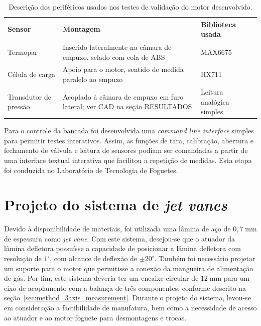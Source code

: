 
\begin{table}[htbp]
    \centering\begin{tabular}{p{}p{}p{}} \toprule
        Sensor & Montagem & Biblioteca usada \\ \midrule
        Termopar & Inserido lateralmente na câmara de empuxo, selado com cola de ABS & MAX6675 \\
        Célula de carga & Apoio para o motor, sentido de medida paralelo ao empuxo & HX711 \\
        Transdutor de pressão & Acoplado à câmara de empuxo em furo lateral; ver CAD na seção RESULTADOS & Leitura analógica simples \\ \bottomrule
    \end{tabular}
    \caption{Descrição dos periféricos usados nos testes de validação do motor desenvolvido.}\label{tab:validation_peripherals}
\end{table}

Para o controle da bancada foi desenvolvida uma \textit{command line interface} simples para permitir testes interativos. Assim, as funções de tara, calibração, abertura e fechamento de válvula e leitura de sensores podiam ser comandadas a partir de uma interface textual interativa que facilitou a repetição de medidas. Esta etapa foi conduzida no Laboratório de Tecnologia de Foguetes.

\section{Projeto do sistema de \textit{jet vanes}}\label{sec:method_jet_vanes}

Devido à disponibilidade de materiais, foi utilizada uma lâmina de aço de \(0,7\;\mathrm{mm}\) de espessura como \textit{jet vane}. Com este sistema, desejou-se que o atuador da lâmina defletora possuísse a capacidade de posicionar a lâmina defletora com resolução de \(1^\circ \), com alcance de deflexão de \(\pm 20^\circ \). Também foi necessário projetar um suporte para o motor que permitisse a conexão da mangueira de alimentação de gás. Por fim, este sistema deveria ter um encaixe circular de \(12\;\mathrm{mm}\) para um eixo de acoplamento com a balança de três componentes, conforme descrito na seção~\ref{sec:method_3axis_measurement}. Durante o projeto do sistema, levou-se em consideração a factibilidade de manufatura, bem como a necessidade de acesso ao atuador e ao motor foguete para desmontagens e trocas.

